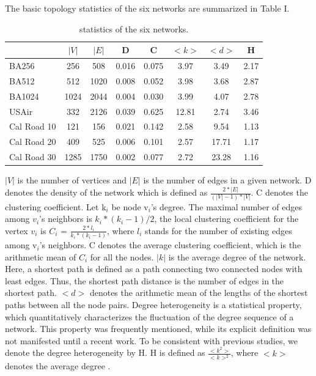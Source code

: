 \documentclass[onecolumn,preprintnumbers,amsmath,amssymb]{revtex4}
\begin{document}
The basic topology statistics of the six networks are summarized in Table I.
\begin{table}[tbp]
\centering  %
\begin{tabular}{lccccccc}  %
\hline  %
&$|V|$ &$|E|$ &D &C &$<k>$ &$<d>$ &H\\ 
\hline  BA256 &256 &508 &0.016 &0.075 &3.97 &3.49 &2.17 \\  
\hline  BA512 &512 &1020 &0.008 &0.052 &3.98 &3.68 &2.87 \\
\hline  BA1024 &1024 &2044 &0.004 &0.030 &3.99 &4.07 &2.78\\
\hline USAir &332 &2126 &0.039 &0.625 &12.81 &2.74 &3.46\\
\hline Cal Road 10 &121 &156 &0.021 &0.142 &2.58 &9.54 &1.13\\
\hline Cal Road 20 &409 &525 &0.006 &0.101 &2.57 &17.71 &1.17\\
\hline Cal Road 30 &1285 &1750 &0.002 &0.077 &2.72 &23.28 &1.16\\
\hline
\end{tabular}
\caption{statistics of the six networks.}
\end{table}
$|V|$ is the number of vertices and $|E|$ is the number of edges in a given network. D denotes the density of the network which is defined as $\frac{2*|E|}{(|V| - 1)*|V|}$\cite{LDB}. 
C denotes the clustering coefficient\cite{SW}. 
Let k$_i$ be node v$_i$'s degree.
The maximal number of  edges among $v_i$'s neighbors is $k_i*(k_i - 1)/2$, the local clustering coefficient for the vertex $v_i$ is $C_i$ = $\frac{2*l_i}{k_i*(k_i-1)}$, where $l_i$ stands for the number of existing  edges among v$_i$'s neighbors. C denotes the average clustering coefficient, which is the arithmetic mean of $C_i$ for all the nodes. 
$|k|$ is the average degree of the network. 
Here, a shortest path is defined as a path connecting two connected nodes with least edges. 
Thus, the shortest path distance is the number of edges in the shortest path. 
$<d>$ denotes the arithmetic mean of the lengths of the shortest paths between all the node pairs.
Degree heterogeneity is a statistical property, which quantitatively characterizes the fluctuation of the degree sequence of a network. This property was frequently mentioned, while its explicit definition was not manifested until a recent work\cite{PML}. To be consistent with previous studies, we denote the degree heterogeneity by H. H is defined as $\frac{<k^2>}{<k>^2}$, where $<k>$ denotes the average degree \cite{KD}.
\end{document}
